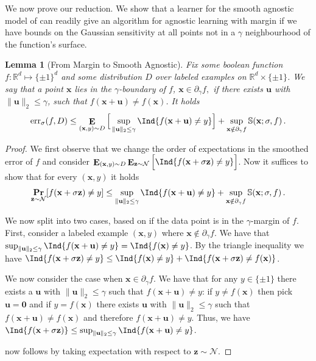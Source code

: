 \documentclass[10pt,a4paper]{article}
\newtheorem{lemma}{Lemma}[section]
\newcommand\twonorm[1]{\|#1\|_2}
\renewcommand\vec[1]{\mathbf{#1}}
\DeclareMathOperator*{\pr}{\mathbf{Pr}}
\DeclareMathOperator*{\E}{\mathbf{E}}
\newcommand{\normal}{\mathcal{N}}
\newcommand{\err}{\mathrm{err}}
\newcommand{\R}{\mathbb{R}}
\newcommand{\1}{\Ind}
\newcommand{\x}{\vec x}
\newcommand{\vu}{\vec u}
\newcommand{\z}{\vec z}
\newcommand{\Gauss}{\mathcal{N}}
\newcommand{\Djoint}{D}
\begin{document}
We now prove our reduction. We show that a learner for the smooth agnostic model of  can readily give an algorithm for agnostic learning with margin if we have bounds on the Gaussian sensitivity at all points not in a $\gamma$ neighbourhood of the function's surface.

\begin{lemma}[From Margin to Smooth Agnostic]
\label{lem:margin_smooth}
Fix some boolean function $f:\R^d\mapsto \{\pm 1\}^d$ and some distribution $D$ over labeled
examples on $\R^d \times \{ \pm 1\}$.
We say that a point $\x$ lies in the $\gamma$-boundary of $f$, $\x \in \partial_\gamma f, $ 
if there exists $\vec u$ with $\|\vec u \|_2 \leq \gamma$, such that
$f(\x + \vec u) \neq f(\x)$. 
It holds
\[
\err_{\sigma}(f,D)
         \leq 
        \E_{(\x, y) \sim \Djoint}\Big[ \sup_{\|\vec u\|_2 \leq \gamma} \1\{f(\x + \vec u) \neq y \} \Big] 
         + \sup_{\x \notin \partial_\gamma f}
         \mathbb S(\x;\sigma, f)\,.
\]
\end{lemma}
\begin{proof}
We first observe that we change the order of expectations in the smoothed error of $f$ 
and consider 
        $
        \E_{(\x,y) \sim \Djoint}
        \E_{\z \sim \normal}
         \Big[\1\{f(\x + \sigma \vec z) \neq y \} \Big] 
         $.
         Now it suffices to show that for every $(\x, y)$ it holds
         \begin{equation}
         \label{eqn:eq:smooth_vs_margin}
         \pr_{\z \sim \normal}[f(\x+ \sigma \vec z) \neq y]
         \leq 
         \sup_{\|\vec u\|_2 \leq \gamma} \1\{f(\x + \vec u) \neq y\}
         + \sup_{\x \notin \partial_\gamma f} \mathbb S(\x; \sigma, f) \,.
         \end{equation}

         We now split into two cases, based on if the data point is in the $\gamma$-margin of $f$. First, consider a labeled example $(\x, y)$ where $\x \notin \partial_\gamma f$.   We have that 
         $\sup_{\|\vec u\|_2 \leq \gamma} \1\{f(\x+\vec u) \neq y\} = 
         \1\{f(\x) \neq y\} $. By the triangle inequality we have 
         $\1\{ f(\x + \sigma \vec z) \neq y \} 
         \leq  \1\{ f(\x) \neq y \}+ \1\{f(\x + \sigma \vec z) \neq f(\x)\}$. 

         We now consider the case when $\x\in \partial_\gamma f$.
         We 
         have that for any $y \in \{\pm 1\}$ there exists a $\vec u$ with $\|\vec u\|_2 \leq \gamma$ such that $f(\x + \vec u) \neq y$: if $y \neq f(\x)$ then pick $\vec u = \vec 0$ and if $y = f(\x)$ there exists $\vec u$ with $\|\vec u\|_2 \leq \gamma$ such that $f(\x + \vec u) \neq f(\x)$ and therefore $f(\x + \vec u) \neq y$.  Thus, we have $\1\{f(\x+\sigma \z)\}\leq \sup_{\twonorm{\vu}\leq \gamma}\1\{f(\x+\vu)\neq y\}$.
         
         now follows by taking expectation with respect to $\vec z\sim \Gauss$.
\end{proof}
\end{document}
